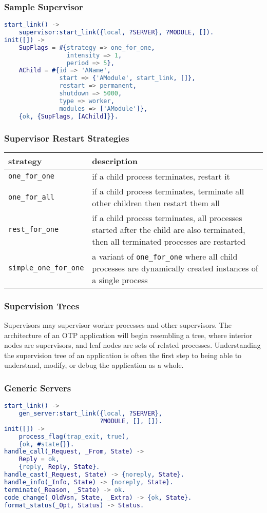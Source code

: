 \documentclass{beamer}
\begin{document}
\begin{frame}[fragile]
  \frametitle{Sample Supervisor}
\begin{lstlisting}[language=erlang]
start_link() ->
    supervisor:start_link({local, ?SERVER}, ?MODULE, []).
init([]) ->
    SupFlags = #{strategy => one_for_one,
                 intensity => 1,
                 period => 5},
    AChild = #{id => 'AName',
               start => {'AModule', start_link, []},
               restart => permanent,
               shutdown => 5000,
               type => worker,
               modules => ['AModule']},
    {ok, {SupFlags, [AChild]}}.
\end{lstlisting}
\end{frame}

\begin{frame}
  \frametitle{Supervisor Restart Strategies}
  \begin{tabular}{|l|p{2.5in}|}
    \hline
    strategy & description \\
    \hline
    {\tt one\_for\_one} & if a child process terminates, restart it \\
    \hline
    {\tt one\_for\_all} & if a child process terminates, terminate all other children then restart them all \\
    \hline
    {\tt rest\_for\_one} & if a child process terminates, all processes started after the child are also terminated, then all terminated processes are restarted \\
    \hline
    {\tt simple\_one\_for\_one} & a variant of {\tt one\_for\_one} where all child processes are dynamically created instances of a single process \\
    \hline
  \end{tabular}
\end{frame}

\begin{frame}
  \frametitle{Supervision Trees}
  Supervisors may supervisor worker processes and other supervisors.
  The architecture of an OTP application will begin resembling a tree,
  where interior nodes are supervisors, and leaf nodes are sets of
  related processes.  Understanding the supervision tree of an
  application is often the first step to being able to understand,
  modify, or debug the application as a whole.
\end{frame}

\begin{frame}[fragile]
  \frametitle{Generic Servers}
\begin{lstlisting}[language=erlang]
start_link() ->
    gen_server:start_link({local, ?SERVER},
                          ?MODULE, [], []).
init([]) ->
    process_flag(trap_exit, true),
    {ok, #state{}}.
handle_call(_Request, _From, State) ->
    Reply = ok,
    {reply, Reply, State}.
handle_cast(_Request, State) -> {noreply, State}.
handle_info(_Info, State) -> {noreply, State}.
terminate(_Reason, _State) -> ok.
code_change(_OldVsn, State, _Extra) -> {ok, State}.
format_status(_Opt, Status) -> Status.
\end{lstlisting}
\end{frame}
\end{document}
